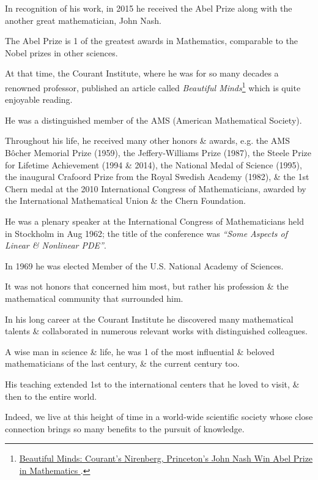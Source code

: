 \documentclass{article}
\begin{document}
%
In recognition of his work, in 2015 he received the Abel Prize along with the another great mathematician, John Nash.

The Abel Prize is 1 of the greatest awards in Mathematics, comparable to the Nobel prizes in other sciences.

At that time, the Courant Institute, where he was for so many decades a renowned professor, published an article called \textit{Beautiful Minds}\footnote{\href{https://www.nyu.edu/about/news-publications/news/2015/march/beautiful-minds-courantsnirenberg-princetons-john-nash-win-abel-prize-in-mathematics-.html}{Beautiful Minds: Courant's Nirenberg, Princeton's John Nash Win Abel Prize in Mathematics }.} which is quite enjoyable reading.

%
He was a distinguished member of the AMS (American Mathematical Society).

Throughout his life, he received many other honors \& awards, e.g. the AMS B\^ocher Memorial Prize (1959), the Jeffery-Williams Prize (1987), the Steele Prize for Lifetime Achievement (1994 \& 2014), the National Medal of Science (1995), the inaugural Crafoord Prize from the Royal Swedish Academy (1982), \& the 1st Chern medal at the 2010 International Congress of Mathematicians, awarded by the International Mathematical Union \& the Chern Foundation.

He was a plenary speaker at the International Congress of Mathematicians held in Stockholm in Aug 1962; the title of the conference was \textit{``Some Aspects of Linear \& Nonlinear PDE''}.

In 1969 he was elected Member of the U.S. National Academy of Sciences.

%
It was not honors that concerned him most, but rather his profession \& the mathematical community that surrounded him.

In his long career at the Courant Institute he discovered many mathematical talents \& collaborated in numerous relevant works with distinguished colleagues.

A wise man in science \& life, he was 1 of the most influential \& beloved mathematicians of the last century, \& the current century too.

His teaching extended 1st to the international centers that he loved to visit, \& then to the entire world.

Indeed, we live at this height of time in a world-wide scientific society whose close connection brings so many benefits to the pursuit of knowledge.
\end{document}

